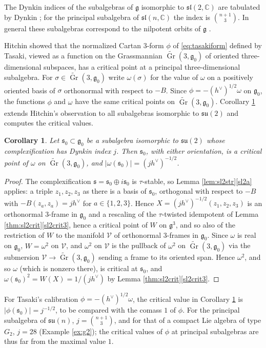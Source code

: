 \documentclass[leqno,10pt]{amsart}
\newtheorem{corollary}[theorem]{Corollary}%
\theoremstyle{definition}
\numberwithin{equation}{section}
\newcommand{\grass}{\operatorname{Gr}}
\newcommand{\om}{\omega}
\newcommand{\su}{\mathfrak{su}}
\newcommand{\sll}{\mathfrak{sl}}
\newcommand{\g}{\mathfrak{g}}
\newcommand{\com}{\mathbb C}
\newcommand{\gz}{\g_{0}}
\newcommand{\hv}{h^\vee}
\newcommand{\subs}{\mathfrak{s}}
\begin{document}
The Dynkin indices of the subalgebras of $\g$ isomorphic to $\sll(2, \com)$ are tabulated by Dynkin \cite{Dynkin-semisimplesubalgebras}; for the principal subalgebra of $\sll(n, \com)$ the index is $\binom{n+1}{3}$. In general these subalgebras correspond to the nilpotent orbits of $\g$ \cite{Collingwood-McGovern}.

Hitchin \cite[Theorem~1]{Hitchin-calibrations} showed that the normalized Cartan $3$-form $\phi$ of \eqref{eq:tasakiform} defined by Tasaki, viewed as a function on the Grassmannian $\widetilde{\grass}(3, \gz)$ of oriented three-dimensional subspaces, has a critical point at a principal three-dimensional subalgebra. For $\sigma \in \widetilde{\grass}(3, \gz)$ write $\om(\sigma)$ for the value of $\om$ on a positively oriented basis of $\sigma$ orthonormal with respect to $-B$. Since $\phi = -(\hv)^{1/2}\om$ on $\gz$, the functions $\phi$ and $\om$ have the same critical points on $\widetilde{\grass}(3, \gz)$. Corollary \ref{cor:hitchin} extends Hitchin's observation to all subalgebras isomorphic to $\su(2)$ and computes the critical values.

\begin{corollary}\label{cor:hitchin}
Let $\subs_{0} \subset \gz$ be a subalgebra isomorphic to $\su(2)$ whose complexification has Dynkin index $j$. Then $\subs_{0}$, with either orientation, is a critical point of $\om$ on $\widetilde{\grass}(3, \gz)$, and $|\om(\subs_{0})| = (j\hv)^{-1/2}$.
\end{corollary}
\begin{proof}
The complexification $\subs = \subs_{0} \oplus i\subs_{0}$ is $\tau$-stable, so Lemma \ref{lem:sl2str}\ref{sl2a} applies: a triple $z_{1}, z_{2}, z_{3}$ as there is a basis of $\subs_{0}$, orthogonal with respect to $-B$ with $-B(z_{a}, z_{a}) = j\hv$ for $a \in \{1, 2, 3\}$. Hence $X = (j\hv)^{-1/2}(z_{1}, z_{2}, z_{3})$ is an orthonormal $3$-frame in $\gz$ and a rescaling of the $\tau$-twisted idempotent of Lemma \ref{thm:sl2crit}\ref{sl2crit3}, hence a critical point of $W$ on $\g^{3}$, and so also of the restriction of $W$ to the manifold $\mathcal{V}$ of orthonormal $3$-frames in $\gz$. Since $\om$ is real on $\gz$, $W = \om^{2}$ on $\mathcal{V}$, and $\om^{2}$ on $\mathcal{V}$ is the pullback of $\om^{2}$ on $\widetilde{\grass}(3, \gz)$ via the submersion $\mathcal{V} \to \widetilde{\grass}(3, \gz)$ sending a frame to its oriented span. Hence $\om^{2}$, and so $\om$ (which is nonzero there), is critical at $\subs_{0}$, and $\om(\subs_{0})^{2} = W(X) = 1/(j\hv)$ by Lemma \ref{thm:sl2crit}\ref{sl2crit3}.
\end{proof}
For Tasaki's calibration $\phi = -(\hv)^{1/2}\om$, the critical value in Corollary \ref{cor:hitchin} is $|\phi(\subs_{0})| = j^{-1/2}$, to be compared with the comass $1$ of $\phi$. For the principal subalgebra of $\su(n)$, $j = \binom{n+1}{3}$, and for that of a compact Lie algebra of type $G_{2}$, $j = 28$ (Example \ref{ex:g2}); the critical values of $\phi$ at principal subalgebras are thus far from the maximal value $1$.
\end{document}
